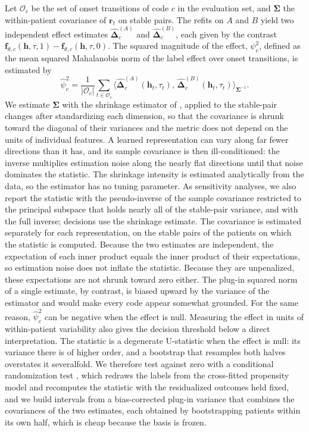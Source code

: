 Let $\mathcal{O}_c$ be the set of onset transitions of code $c$ in the evaluation set, and $\boldsymbol{\Sigma}$ the within-patient covariance of $\mathbf{r}_t$ on stable pairs. The refits on $A$ and $B$ yield two independent effect estimates $\hat{\boldsymbol{\Delta}}^{(A)}_c$ and $\hat{\boldsymbol{\Delta}}^{(B)}_c$, each given by the contrast $\mathbf{f}_{\theta,c}(\mathbf{h},\tau,1)-\mathbf{f}_{\theta,c}(\mathbf{h},\tau,0)$. The squared magnitude of the effect, $\psi^{2}_c$, defined as the mean squared Mahalanobis norm of the label effect over onset transitions, is estimated by
\begin{equation}
\label{eq:wm-effect}
\hat{\psi}^{2}_c=\frac{1}{|\mathcal{O}_c|}\sum_{t\in\mathcal{O}_c}\big\langle\hat{\boldsymbol{\Delta}}^{(A)}_c(\mathbf{h}_t,\tau_t),\,\hat{\boldsymbol{\Delta}}^{(B)}_c(\mathbf{h}_t,\tau_t)\big\rangle_{\boldsymbol{\Sigma}^{-1}}.
\end{equation}
We estimate $\boldsymbol{\Sigma}$ with the shrinkage estimator of \citet{ledoit2004wellconditioned}, applied to the stable-pair changes after standardizing each dimension, so that the covariance is shrunk toward the diagonal of their variances and the metric does not depend on the units of individual features. A learned representation can vary along far fewer directions than it has, and its sample covariance is then ill-conditioned: the inverse multiplies estimation noise along the nearly flat directions until that noise dominates the statistic. The shrinkage intensity is estimated analytically from the data, so the estimator has no tuning parameter. As sensitivity analyses, we also report the statistic with the pseudo-inverse of the sample covariance restricted to the principal subspace that holds nearly all of the stable-pair variance, and with the full inverse; decisions use the shrinkage estimate. The covariance is estimated separately for each representation, on the stable pairs of the patients on which the statistic is computed.
Because the two estimates are independent, the expectation of each inner product equals the inner product of their expectations, so estimation noise does not inflate the statistic. Because they are unpenalized, these expectations are not shrunk toward zero either. The plug-in squared norm of a single estimate, by contrast, is biased upward by the variance of the estimator and would make every code appear somewhat grounded. For the same reason, $\hat{\psi}^{2}_c$ can be negative when the effect is null. Measuring the effect in units of within-patient variability also gives the decision threshold below a direct interpretation. The statistic is a degenerate U-statistic when the effect is null: its variance there is of higher order, and a bootstrap that resamples both halves overstates it severalfold. We therefore test against zero with a conditional randomization test \citep{candes2018panning}, which redraws the labels from the cross-fitted propensity model and recomputes the statistic with the residualized outcomes held fixed, and we build intervals from a bias-corrected plug-in variance that combines the covariances of the two estimates, each obtained by bootstrapping patients within its own half, which is cheap because the basis is frozen.


